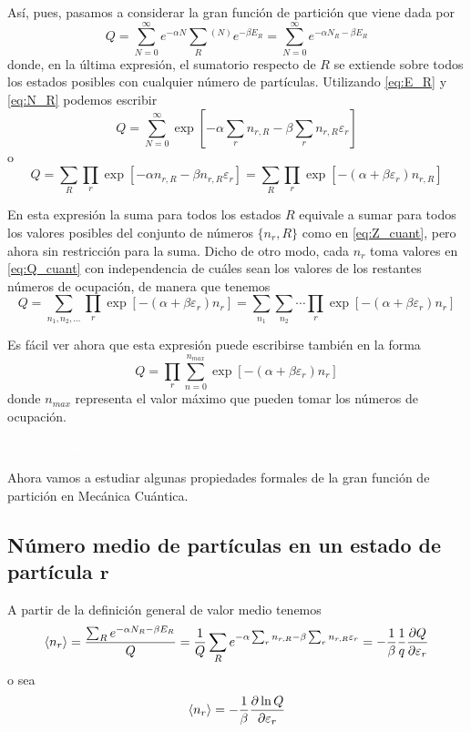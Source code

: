 Así, pues, pasamos a considerar la gran función de partición que viene dada por
\begin{equation}
	Q = \sum_{N=0}^\infty e^{-\alpha N} \sum_{R}^{} {}^{(N)} e^{-\beta E_R} = \sum_{N=0}^\infty e^{-\alpha N_R -\beta E_R}
\end{equation}
donde, en la última expresión, el sumatorio respecto de $R$ se extiende sobre todos los estados posibles con cualquier número de partículas.
Utilizando \eqref{eq:E_R} y  \eqref{eq:N_R} podemos escribir
\begin{equation}
	Q = \sum_{N=0}^\infty \exp \left[ -\alpha \sum_r n_{r,R} -\beta \sum_r n_{r,R} \varepsilon_r \right] 
\end{equation}
o
\begin{equation}\label{eq:Q_cuant}
	Q = \sum_R \prod_r \exp \left[ -\alpha n_{r,R} -\beta n_{r,R} \varepsilon_r \right]  = \sum_R \prod_r \exp \left[  -(\alpha  + \beta \varepsilon_r) n_{r,R}\right]
\end{equation}

En esta expresión la suma para todos los estados $R$ equivale a sumar para todos los valores posibles del conjunto de números $\{n_r,R\}$ como en \eqref{eq:Z_cuant}, pero ahora sin restricción para la suma.
Dicho de otro modo, cada $n_r$ toma valores en \eqref{eq:Q_cuant} con independencia de cuáles sean los valores de los restantes números de ocupación, de manera que tenemos
\begin{equation}
	Q = \sum_{n_1, n_2, \ldots} \prod_r \exp \left[  -(\alpha  + \beta \varepsilon_r) n_r\right] = \sum_{n_1} \sum_{n_2} \cdots \prod_r \exp \left[  -(\alpha  + \beta \varepsilon_r) n_{r}\right]
\end{equation}

Es fácil ver ahora que esta expresión puede escribirse también en la forma
\begin{equation}\label{eq:Q_cuant2}
	Q = \prod_r \sum_{n=0}^{n_{max}} \exp \left[  -(\alpha  + \beta \varepsilon_r) n_r \right]
\end{equation}
donde $n_{max}$ representa el valor máximo que pueden tomar los números de ocupación.

\colorbox{red!60}{\textcolor{white}{\textit{[Aquí falta alguna cosilla, a saber si la hago]}}}

Ahora vamos a estudiar algunas propiedades formales de la gran función de partición en Mecánica Cuántica.

\subsection*{Número medio de partículas en un estado de partícula $\bm{r}$}
A partir de la definición general de valor medio tenemos
$$\expval{n_r} = \frac{\sum_R e^{-\alpha N_R -\beta E_R}}{Q} = \frac{1}{Q} \sum_R e^{-\alpha \sum_r n_{r,R} -\beta \sum_r n_{r,R} \varepsilon_r} = - \frac{1}{\beta} \frac{1}{q} \frac{\partial Q}{\partial \varepsilon_r}$$
o sea
\begin{equation}
	\expval{n_r} = - \frac{1}{\beta} \frac{\partial \ln Q}{\partial \varepsilon_r}
\end{equation}

